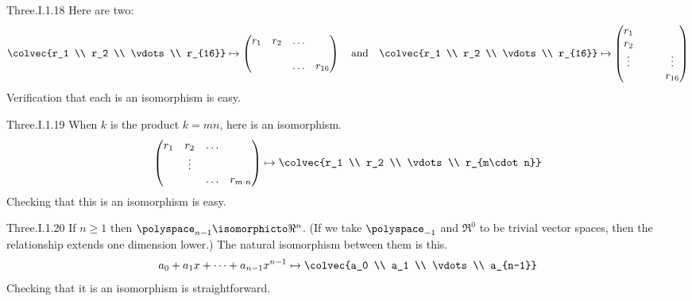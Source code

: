 \begin{ans}{Three.I.1.18}
        Here are two:
        \begin{equation*}
           \colvec{r_1 \\ r_2 \\ \vdots \\ r_{16}}
              \mapsto
           \begin{pmatrix}
              r_1  &r_2  &\ldots  \\
                   &              \\
                   &     &\ldots  &r_{16}
           \end{pmatrix}
           \quad\text{and}\quad
           \colvec{r_1 \\ r_2 \\ \vdots \\ r_{16}}
              \mapsto
           \begin{pmatrix}
              r_1    &                    \\
              r_2    &                    \\
              \vdots &   &        &\vdots \\
                   &     &        &r_{16}
           \end{pmatrix}
        \end{equation*}
        Verification that each is an isomorphism is easy.
    
\end{ans}
\begin{ans}{Three.I.1.19}
        When $k$ is the product \( k=mn \), here is an isomorphism.
        \begin{equation*}
           \begin{pmatrix}
              r_1  &r_2  &\ldots  \\
                   &\vdots        \\
                   &     &\ldots  &r_{m\cdot n}
           \end{pmatrix}
           \mapsto
           \colvec{r_1 \\ r_2 \\ \vdots \\ r_{m\cdot n}}
        \end{equation*}
        Checking that this is an isomorphism is easy.
      
\end{ans}
\begin{ans}{Three.I.1.20}
        If \( n\geq 1 \) then \( \polyspace_{n-1}\isomorphicto\Re^n \).
        (If we take \( \polyspace_{-1} \) and \( \Re^0 \) to be trivial vector
        spaces, then the relationship extends one dimension lower.)
        The natural isomorphism between them is this.
        \begin{equation*}
          a_0+a_1x+\dots+a_{n-1}x^{n-1}
          \mapsto\colvec{a_0 \\ a_1 \\ \vdots \\ a_{n-1}}
        \end{equation*}
        Checking that it is an isomorphism is straightforward.
     
\end{ans}
